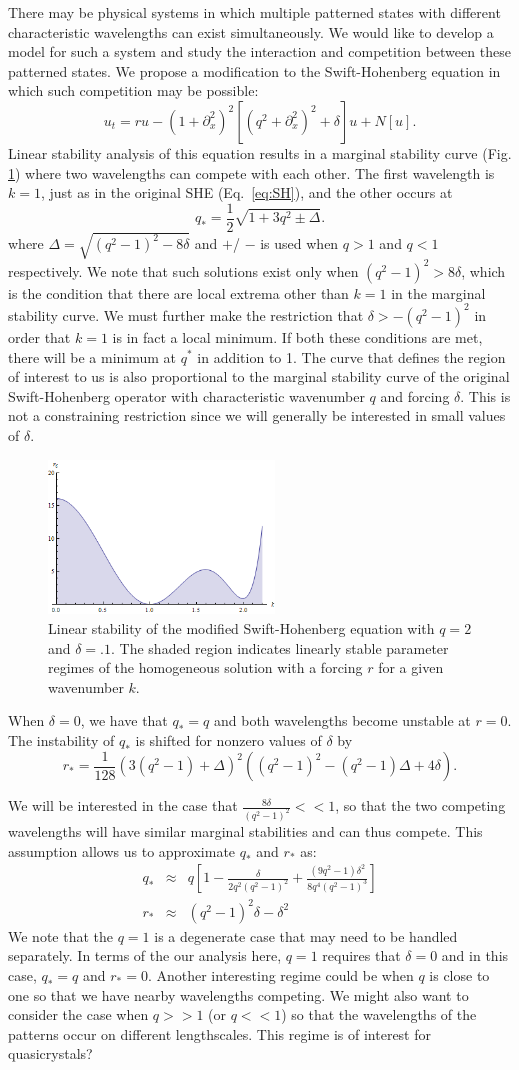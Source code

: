 \documentclass[api,pof,pre,12pt,a4paper]{revtex4-1}
\newcommand{\beqn}{\begin{equation}}
\newcommand{\eeqn}{\end{equation}}
\newcommand{\beqa}{\begin{eqnarray}}
\newcommand{\eeqa}{\end{eqnarray}}
\newcommand{\FIGmarginalstability}{
\begin{figure}[h]\center
\includegraphics[width=60mm]{MarginalStability.png}
\caption{\label{fig:marginalstability} Linear stability of the modified Swift-Hohenberg equation with $q=2$ and $\delta=.1$.  The shaded region indicates linearly stable parameter regimes of the homogeneous solution with a forcing $r$ for a given wavenumber $k$.}
\end{figure}
}
\begin{document}
There may be physical systems in which multiple patterned states with different characteristic wavelengths can exist simultaneously.  We would like to develop a model for such a system and study the interaction and competition between these patterned states.  We propose a modification to the Swift-Hohenberg equation in which such competition may be possible:
\begin{equation}
u_t= r u-\left(1+\partial_{x}^2\right)^2 \left[\left(q^2+\partial_{x}^2\right)^2+\delta \right] u+N[u]\label{eq:SHm}.
\end{equation}
Linear stability analysis of this equation results in a marginal stability curve (Fig. \ref{fig:marginalstability}) where two wavelengths can compete with each other.  The first wavelength is  $k=1$, just as in the original SHE (Eq.~\ref{eq:SH}), and the other occurs at 
\beqn
q_*=\frac{1}{2}\sqrt{1+3q^2 \pm\Delta}.
\eeqn
where $\Delta=\sqrt{(q^2-1)^2-8\delta}$ and $+$/ $-$ is used when $q>1$ and $q<1$ respectively.  We note that such solutions exist only when $(q^2-1)^2>8\delta$, which is the condition that there are  local extrema other than $k=1$ in the marginal stability curve.  We must further make the restriction that $\delta>-(q^2-1)^2$ in order that $k=1$ is in fact a local minimum.  If both these conditions are met, there will be a minimum at $q^*$ in addition to 1.  The curve that defines the region of interest to us is also proportional to the marginal stability curve of the original Swift-Hohenberg operator with characteristic wavenumber $q$ and forcing $\delta$.    This is not a constraining restriction since we will generally be interested in small values of $\delta$.
\FIGmarginalstability
When $\delta=0$, we have that $q_*=q$  and both wavelengths  become unstable at $r=0$. The instability of $q_*$ is shifted for nonzero values of $\delta$ by
\beqn
r_*=\frac{1}{128} \left(3( q^2-1)+\Delta\right)^2 \left( (q^2-1)^2- (q^2-1)\Delta+4 \delta \right).
\eeqn

We will be interested in the case that $\tfrac{8\delta}{(q^2-1)^2}<<1$,  so that the two competing wavelengths will have similar marginal stabilities and can thus compete.  This assumption allows us to approximate $q_*$ and $r_*$ as:
\beqa
q_*&\approx&q\left[1-\frac{\delta}{2q^2(q^2-1)^2}+\frac{\left(9 q^2-1\right) \delta ^2}{8 q^4 \left(q^2-1\right)^3}\right] \\
r_*&\approx& (q^2-1)^2 \delta-\delta^2
\eeqa
We note that the $q=1$ is a degenerate case that may need to be handled separately.  In terms of the our analysis here, $q=1$ requires that $\delta=0$ and in this case, $q_*=q$ and $r_*=0$.  Another interesting regime could be when $q$ is close to one so that we have nearby wavelengths competing. We might also want to consider the case when $q>>1$ (or $q<<1$) so that the wavelengths of the patterns occur on different lengthscales.  This regime is of interest for quasicrystals?
\end{document}
